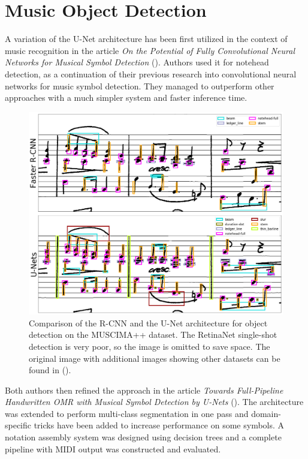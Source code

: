 \section{Music Object Detection}

A variation of the U-Net architecture has been first utilized in the context of music recognition in the article \emph{On the Potential of Fully Convolutional Neural Networks for Musical Symbol Detection} (\cite{DorferEtAl}). Authors used it for notehead detection, as a continuation of their previous research into convolutional neural networks for music symbol detection. They managed to outperform other approaches with a much simpler system and faster inference time.

\begin{figure}[ht]
    \centering
    \includegraphics[width=145mm]{../img/muscima-detection-comparison.png}
    \caption{Comparison of the R-CNN and the U-Net architecture for object detection on the MUSCIMA++ dataset. The RetinaNet single-shot detection is very poor, so the image is omitted to save space. The original image with additional images showing other datasets can be found in (\cite{PachaBaseline}).}
    \label{fig:MuscimaDetectionComparison}
\end{figure}

Both authors then refined the approach in the article \emph{Towards Full-Pipeline Handwritten OMR with Musical Symbol Detection by U-Nets} (\cite{HajicEtAl}). The architecture was extended to perform multi-class segmentation in one pass and domain-specific tricks have been added to increase performance on some symbols. A notation assembly system was designed using decision trees and a complete pipeline with MIDI output was constructed and evaluated.

